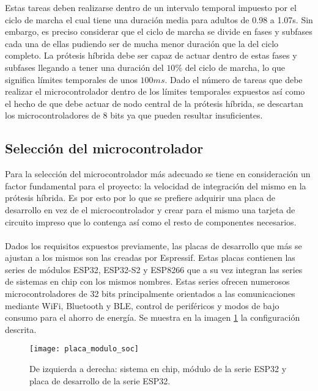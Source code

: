 Estas tareas deben realizarse dentro de un intervalo temporal impuesto por el ciclo de marcha el cual tiene una duración media para adultos de 0.98 a 1.07s\cite{duracion_ciclo_marcha}. Sin embargo, es preciso considerar que el ciclo de marcha se divide en fases y subfases cada una de ellas pudiendo ser de mucha menor duración que la del ciclo completo. La prótesis híbrida debe ser capaz de actuar dentro de estas fases y subfases llegando a tener una duración del $10\%$ del ciclo de marcha\cite{duracion_fases_ciclo_marcha}, lo que significa límites temporales de unos $100ms$. Dado el número de tareas que debe realizar el microcontrolador dentro de los límites temporales expuestos así como el hecho de que debe actuar de nodo central de la prótesis híbrida, se descartan los microcontroladores de 8 bits ya que pueden resultar insuficientes.


\subsection{Selección del microcontrolador}

Para la selección del microcontrolador más adecuado se tiene en consideración un factor fundamental para el proyecto: la velocidad de integración del mismo en la prótesis híbrida. Es por esto por lo que se prefiere adquirir una placa de desarrollo en vez de el microcontrolador y crear para el mismo una tarjeta de circuito impreso que lo contenga así como el resto de componentes necesarios.
\\
\\
Dados los requisitos expuestos previamente, las placas de desarrollo que más se ajustan a los mismos son las creadas por Espressif\cite{espressif}. Estas placas contienen las series de módulos ESP32, ESP32-S2 y ESP8266 que a su vez integran las series de sistemas en chip con los mismos nombres. Estas series ofrecen numerosos microcontroladores de 32 bits principalmente orientados a las comunicaciones mediante WiFi, Bluetooth y BLE, control de periféricos y modos de bajo consumo para el ahorro de energía. Se muestra en la imagen \ref{fig:placa_modulo_soc} la configuración descrita.\\

\begin{figure}[!htb]
\centering
\texttt{[image: placa\_modulo\_soc]}
  \caption{De izquierda a derecha: sistema en chip, módulo de la serie ESP32 y placa de desarrollo de la serie ESP32.}\label{fig:placa_modulo_soc}
\end{figure}

